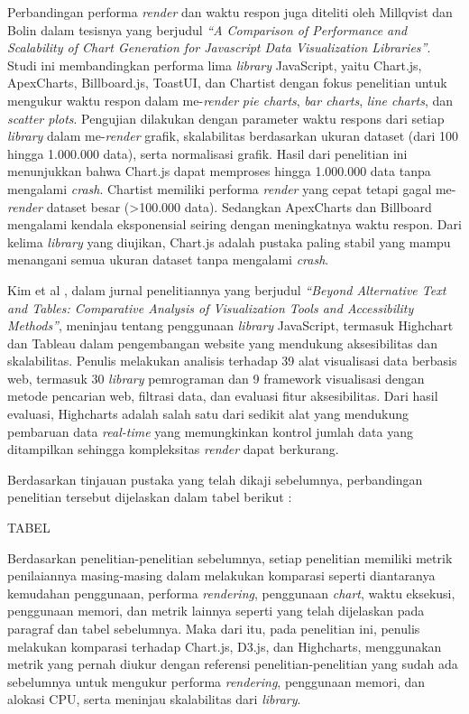 Perbandingan performa \textit{render} dan waktu respon juga diteliti oleh Millqvist dan Bolin \cite{Millqvist2022} dalam tesisnya yang berjudul \textit{“A Comparison of Performance and Scalability of Chart Generation for Javascript Data Visualization Libraries”}. Studi ini membandingkan performa lima \textit{library} JavaScript, yaitu Chart.js, ApexCharts, Billboard.js, ToastUI, dan Chartist dengan fokus penelitian untuk mengukur waktu respon dalam me-\textit{render} \textit{pie charts}, \textit{bar charts}, \textit{line charts}, dan \textit{scatter plots}. Pengujian dilakukan dengan parameter waktu respons dari setiap \textit{library} dalam me-\textit{render} grafik, skalabilitas berdasarkan ukuran dataset (dari 100 hingga 1.000.000 data), serta normalisasi grafik. Hasil dari penelitian ini menunjukkan bahwa Chart.js dapat memproses hingga 1.000.000 data tanpa mengalami \textit{crash}. Chartist memiliki performa \textit{render} yang cepat tetapi gagal me-\textit{render} dataset besar (>100.000 data). Sedangkan ApexCharts dan Billboard mengalami kendala eksponensial seiring dengan meningkatnya waktu respon. Dari kelima \textit{library} yang diujikan, Chart.js adalah pustaka paling stabil yang mampu menangani semua ukuran dataset tanpa mengalami \textit{crash}. 

Kim et al \cite{Kim2023}, dalam jurnal penelitiannya yang berjudul \textit{“Beyond Alternative Text and Tables: Comparative Analysis of Visualization Tools and Accessibility Methods”}, meninjau tentang penggunaan \textit{library} JavaScript, termasuk Highchart dan Tableau dalam pengembangan website yang mendukung aksesibilitas dan skalabilitas. Penulis melakukan analisis terhadap 39 alat visualisasi data berbasis web, termasuk 30 \textit{library} pemrograman dan 9 framework visualisasi dengan metode pencarian web, filtrasi data, dan evaluasi fitur aksesibilitas. Dari hasil evaluasi, Highcharts adalah salah satu dari sedikit alat yang mendukung pembaruan data \textit{real-time} yang memungkinkan kontrol jumlah data yang ditampilkan sehingga kompleksitas \textit{render} dapat berkurang. 

Berdasarkan tinjauan pustaka yang telah dikaji sebelumnya, perbandingan penelitian tersebut dijelaskan dalam tabel berikut :

TABEL 	

Berdasarkan penelitian-penelitian sebelumnya, setiap penelitian memiliki metrik penilaiannya masing-masing dalam melakukan komparasi seperti diantaranya kemudahan penggunaan, performa \textit{rendering}, penggunaan \textit{chart}, waktu eksekusi, penggunaan memori, dan metrik lainnya seperti yang telah dijelaskan pada paragraf dan tabel sebelumnya. 
Maka dari itu, pada penelitian ini, penulis melakukan komparasi terhadap Chart.js, D3.js, dan Highcharts, menggunakan metrik yang pernah diukur dengan referensi penelitian-penelitian yang sudah ada sebelumnya untuk mengukur performa \textit{rendering}, penggunaan memori, dan alokasi CPU, serta meninjau skalabilitas dari \textit{library}.  

